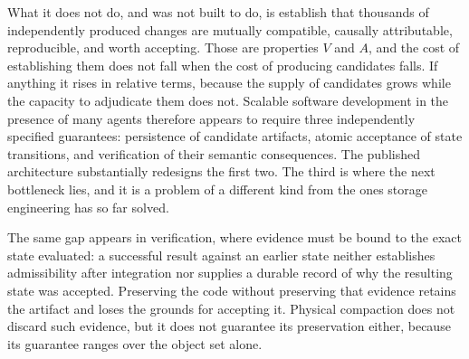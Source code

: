 \documentclass[11pt]{article}
\theoremstyle{definition}
\theoremstyle{plain}
\begin{document}
What it does not do, and was not built to do, is establish that thousands of independently produced changes are mutually compatible, causally attributable, reproducible, and worth accepting. Those are properties $V$ and $A$, and the cost of establishing them does not fall when the cost of producing candidates falls. If anything it rises in relative terms, because the supply of candidates grows while the capacity to adjudicate them does not. Scalable software development in the presence of many agents therefore appears to require three independently specified guarantees: persistence of candidate artifacts, atomic acceptance of state transitions, and verification of their semantic consequences. The published architecture substantially redesigns the first two. The third is where the next bottleneck lies, and it is a problem of a different kind from the ones storage engineering has so far solved.

The same gap appears in verification, where evidence must be bound to the exact state evaluated: a successful result against an earlier state neither establishes admissibility after integration nor supplies a durable record of why the resulting state was accepted. Preserving the code without preserving that evidence retains the artifact and loses the grounds for accepting it. Physical compaction does not discard such evidence, but it does not guarantee its preservation either, because its guarantee ranges over the object set alone.
\end{document}

